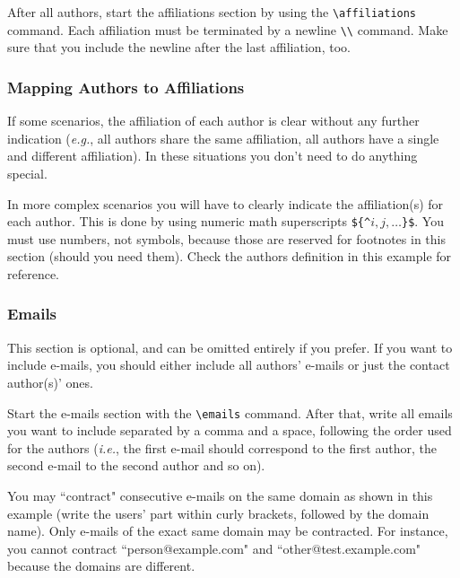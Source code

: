 \documentclass{article}
\begin{document}
After all authors, start the affiliations section by using the {\tt \textbackslash{}affiliations} command.
Each affiliation must be terminated by a newline {\tt \textbackslash{}\textbackslash{}} command. Make sure that you include the newline after the last affiliation, too.

\subsubsection{Mapping Authors to Affiliations}

If some scenarios, the affiliation of each author is clear without any further indication (\emph{e.g.}, all authors share the same affiliation, all authors have a single and different affiliation). In these situations you don't need to do anything special.

In more complex scenarios you will have to clearly indicate the affiliation(s) for each author. This is done by using numeric math superscripts {\tt \$\{\^{}$i,j, \ldots$\}\$}. You must use numbers, not symbols, because those are reserved for footnotes in this section (should you need them). Check the authors definition in this example for reference.

\subsubsection{Emails}

This section is optional, and can be omitted entirely if you prefer. If you want to include e-mails, you should either include all authors' e-mails or just the contact author(s)' ones.

Start the e-mails section with the {\tt \textbackslash{}emails} command. After that, write all emails you want to include separated by a comma and a space, following the order used for the authors (\emph{i.e.}, the first e-mail should correspond to the first author, the second e-mail to the second author and so on).

You may ``contract" consecutive e-mails on the same domain as shown in this example (write the users' part within curly brackets, followed by the domain name). Only e-mails of the exact same domain may be contracted. For instance, you cannot contract ``person@example.com" and ``other@test.example.com" because the domains are different.
\end{document}
